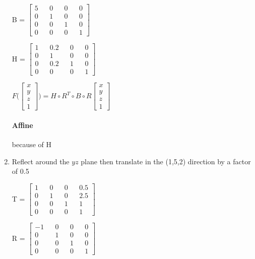 \documentclass{article}
\begin{document}
\begin{enumerate}
        B = $\begin{bmatrix}
            5 && 0 && 0 && 0 \\ 
            0 && 1 && 0 && 0 \\ 
            0 && 0 && 1 && 0 \\ 
            0 && 0 && 0 && 1 
        \end{bmatrix}$
        
        H = $\begin{bmatrix}
            1 && 0.2 && 0 && 0 \\ 
            0 && 1 && 0 && 0 \\ 
            0 && 0.2 && 1 && 0 \\ 
            0 && 0 && 0 && 1 
        \end{bmatrix}$

        $F \Bigg (\begin{bmatrix}
            x \\ y \\ z \\ 1
        \end{bmatrix} \Bigg ) = H \circ R^T \circ B \circ R  \begin{bmatrix}
            x \\ y \\ z \\ 1
        \end{bmatrix}$ 

        \paragraph{Affine} because of H

        \item Reflect around the $yz$ plane then translate in the (1,5,2) direction by a factor of 0.5
        
        T = $\begin{bmatrix}
            1 && 0 && 0 && 0.5 \\ 
            0 && 1 && 0 && 2.5 \\ 
            0 && 0 && 1 && 1 \\ 
            0 && 0 && 0 && 1 
        \end{bmatrix}$

        R = $\begin{bmatrix}
            -1 && 0 && 0 && 0 \\ 
            0 && 1 && 0 && 0 \\ 
            0 && 0 && 1 && 0 \\ 
            0 && 0 && 0 && 1 
        \end{bmatrix}$


\end{enumerate}
\end{document}
